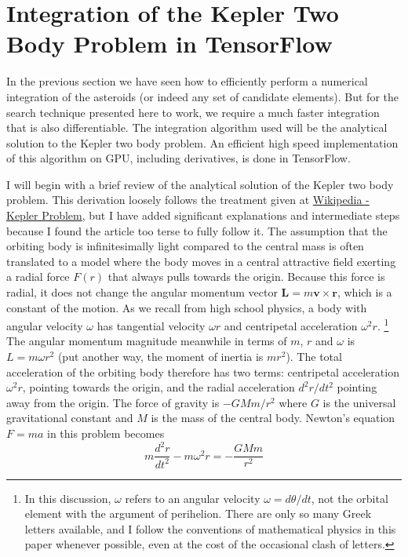 \section{Integration of the Kepler Two Body Problem in TensorFlow}
\label{section_kepler_two_body_tensorflow}
In the previous section we have seen how to efficiently perform a numerical integration of the asteroids (or indeed any set of candidate elements).
But for the search technique presented here to work, we require a much faster integration that is also differentiable.
The integration algorithm used will be the analytical solution to the Kepler two body problem.
An efficient high speed implementation of this algorithm on GPU, including derivatives, is done in TensorFlow.

I will begin with a brief review of the analytical solution of the Kepler two body problem.
This derivation loosely follows the treatment given at \href{https://en.wikipedia.org/wiki/Kepler_problem}{Wikipedia - Kepler Problem},
but I have added significant explanations and intermediate steps because I found the article too terse to fully follow it.
The assumption that the orbiting body is infinitesimally light compared to the central mass is often translated to a model 
where the body moves in a central attractive field exerting a radial force $F(r)$ that always pulls towards the origin.
Because this force is radial, it does not change the angular momentum vector $\mathbf{L} = m\mathbf{v} \times \mathbf{r}$, 
which is a constant of the motion.
As we recall from high school physics, a body with angular velocity $\omega$ has tangential velocity $\omega r$
and centripetal acceleration $\omega^2 r$.
\footnote{
In this discussion, $\omega$ refers to an angular velocity $\omega = d\theta / dt$, not the orbital element with the argument of perihelion.
There are only so many Greek letters available, and I follow the conventions of mathematical physics in this paper whenever possible,
even at the cost of the occasional clash of letters.}
The angular momentum magnitude meanwhile in terms of $m$, $r$ and $\omega$ is $L = m \omega r^2$ 
(put another way, the moment of inertia is $mr^2$).
The total acceleration of the orbiting body therefore has two terms: centripetal acceleration $\omega^2r$, pointing towards the origin,
and the radial acceleration $d^2r / dt^2$ pointing away from the origin.
The force of gravity is $-G M m / r^2$ where $G$ is the universal gravitational constant and $M$ is the mass of the central body.
Newton's equation $F = ma$ in this problem becomes
$$ m \frac{d^2r}{dt^2} - m \omega^2 r = - \frac{G M m }{r^2}$$
